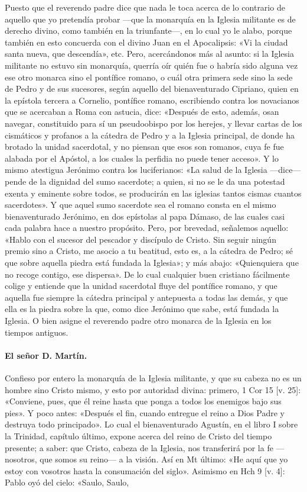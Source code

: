 Puesto que el reverendo padre dice que nada le toca acerca de lo contrario de aquello que yo pretendía probar —que la monarquía en la Iglesia militante es de derecho divino, como también en la triunfante—, en lo cual yo le alabo, porque también en esto concuerda con el divino Juan en el Apocalipsis: «Vi la ciudad santa nueva, que descendía», etc. Pero, acercándonos más al asunto: si la Iglesia militante no estuvo sin monarquía, querría oír quién fue o habría sido alguna vez ese otro monarca sino el pontífice romano, o cuál otra primera sede sino la sede de Pedro y de sus sucesores, según aquello del bienaventurado Cipriano, quien en la epístola tercera a Cornelio, pontífice romano, escribiendo contra los novacianos que se acercaban a Roma con astucia, dice: «Después de esto, además, osan navegar, constituido para sí un pseudoobispo por los herejes, y llevar cartas de los cismáticos y profanos a la cátedra de Pedro y a la Iglesia principal, de donde ha brotado la unidad sacerdotal, y no piensan que esos son romanos, cuya fe fue alabada por el Apóstol, a los cuales la perfidia no puede tener acceso». Y lo mismo atestigua Jerónimo contra los luciferianos: «La salud de la Iglesia —dice— pende de la dignidad del sumo sacerdote; a quien, si no se le da una potestad exenta y eminente sobre todos, se producirán en las iglesias tantos cismas cuantos sacerdotes». Y que aquel sumo sacerdote sea el romano consta en el mismo bienaventurado Jerónimo, en dos epístolas al papa Dámaso, de las cuales casi cada palabra hace a nuestro propósito. Pero, por brevedad, señalemos aquello: «Hablo con el sucesor del pescador y discípulo de Cristo. Sin seguir ningún premio sino a Cristo, me asocio a tu beatitud, esto es, a la cátedra \marginpar{\small[257]} de Pedro; sé que sobre aquella piedra está fundada la Iglesia»; y más abajo: «Quienquiera que no recoge contigo, ese dispersa». De lo cual cualquier buen cristiano fácilmente colige y entiende que la unidad sacerdotal fluye del pontífice romano, y que aquella fue siempre la cátedra principal y antepuesta a todas las demás, y que ella es la piedra sobre la que, como dice Jerónimo que sabe, está fundada la Iglesia. O bien asigne el reverendo padre otro monarca de la Iglesia en los tiempos antiguos.

\paragraph*{El señor D. Martín.}

Confieso por entero la monarquía de la Iglesia militante, y que su cabeza no es un hombre sino Cristo mismo, y esto por autoridad divina: primero, 1 Cor 15 [v. 25]: «Conviene, pues, que él reine hasta que ponga a todos los enemigos bajo sus pies». Y poco antes: «Después el fin, cuando entregue el reino a Dios Padre y destruya todo principado». Lo cual el bienaventurado Agustín, en el libro I sobre la Trinidad, capítulo último, expone acerca del reino de Cristo del tiempo presente; a saber: que Cristo, cabeza de la Iglesia, nos transferirá por la fe —nosotros, que somos su reino— a la visión. Así en Mt último: «He aquí que yo estoy con vosotros hasta la consumación del siglo». Asimismo en Hch 9 [v. 4]: Pablo oyó del cielo: «Saulo, Saulo,

